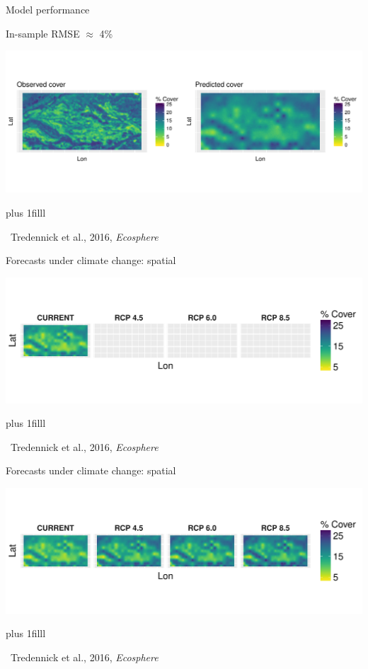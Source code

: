\documentclass[12pt, compress, aspectratio=1610]{beamer}
\newcommand{\btVFill}{\vskip0pt plus 1filll}
\newcommand{\credit}[1]{\btVFill\par\hfill \footnotesize ~#1}
\begin{document}
\begin{frame}{%
\protect\hypertarget{model-performance}{%
Model performance}}

\small{In-sample RMSE $\approx$ 4\%}

\includegraphics[width=\textwidth]{./figures/obs_predict_spatial_pres.pdf}

\credit{Tredennick et al., 2016, \emph{Ecosphere}}

\end{frame}

\begin{frame}{%
\protect\hypertarget{forecasts-under-climate-change-spatial}{%
Forecasts under climate change: spatial}}

\includegraphics[width=\textwidth]{./figures/clim_change_mean_spatial_empty.pdf}

\credit{Tredennick et al., 2016, \emph{Ecosphere}}

\end{frame}

\begin{frame}{%
\protect\hypertarget{forecasts-under-climate-change-spatial-1}{%
Forecasts under climate change: spatial}}

\includegraphics[width=\textwidth]{./figures/clim_change_mean_spatial.pdf}

\credit{Tredennick et al., 2016, \emph{Ecosphere}}

\end{frame}
\end{document}

